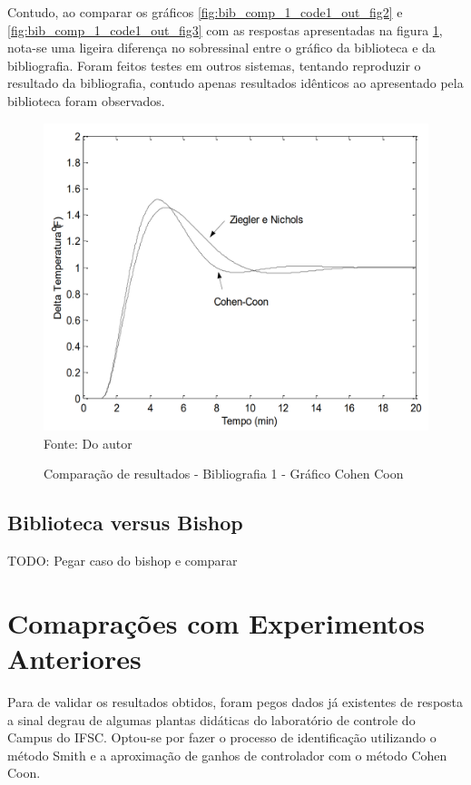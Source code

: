 Contudo, ao comparar os gráficos \ref{fig:bib_comp_1_code1_out_fig2} e \ref{fig:bib_comp_1_code1_out_fig3} com as
respostas apresentadas na figura \ref{fig:bib_comp_1_ctrl_fig},
nota-se uma ligeira diferença no sobressinal entre o gráfico da biblioteca e da bibliografia.
Foram feitos testes em outros sistemas, tentando reproduzir o resultado da bibliografia, contudo apenas resultados
idênticos ao apresentado pela biblioteca foram observados.

\begin{figure}[H]
    \centering
    \caption{Comparação de resultados - Bibliografia 1 - Gráfico Cohen Coon}
    \includegraphics[scale=0.4]{figuras/bib_comp_1_ctrl_fig}
    \label{fig:bib_comp_1_ctrl_fig}
    \\
    \vspace{0cm}\hspace{0cm}\small{Fonte: Do autor}
\end{figure}

\subsection{Biblioteca versus Bishop}

TODO: Pegar caso do bishop e comparar


\section{Comaprações com Experimentos Anteriores}

Para de validar os resultados obtidos, foram pegos dados já existentes de resposta a sinal degrau de algumas plantas
didáticas do laboratório de controle do Campus do IFSC.
Optou-se por fazer o processo de identificação utilizando o método Smith e a aproximação de ganhos de controlador
com o método Cohen Coon.

